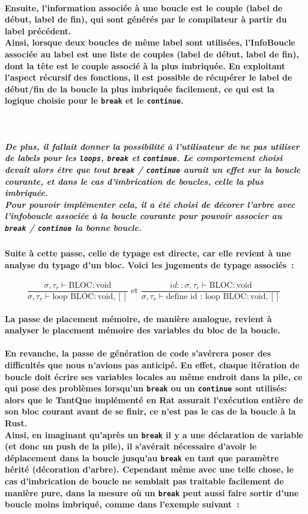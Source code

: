 \documentclass[french]{article}
\newcommand{\jugementLoop}{
        \dfrac{\sigma, \tau_r \vdash \text{BLOC} : \text{void}}
              {\sigma, \tau_r \vdash \text{loop} \text{ BLOC} : \text{void}, []}
        }
\newcommand{\jugementLoopId}{
        \dfrac{id::\sigma, \tau_r \vdash \text{BLOC} : \text{void}}
              {\sigma, \tau_r \vdash \text{define id : loop} \text{ BLOC} : \text{void}, []}
        }
\begin{document}
\paragraph*{Ensuite, l'information associée à une boucle est le couple (label de début, label de fin), qui sont générés par le compilateur à partir du label précédent. \\
Ainsi, lorsque deux boucles de même label sont utilisées, l'InfoBoucle associée au label est une liste de couples 
(label de début, label de fin), dont la tête est le couple associé à la plus imbriquée.
En exploitant l'aspect récursif des fonctions, il est possible de récupérer le label de début/fin de la boucle la plus imbriquée facilement,
ce qui est la logique choisie pour le \texttt{break} et le \texttt{continue}.}\,
\subparagraph*{De plus, il fallait donner la possibilité à l'utilisateur de ne pas utiliser de labels pour les \texttt{loops}, \texttt{break} et \texttt{continue}. Le comportement
choisi devait alors être que tout \texttt{break} / \texttt{continue} aurait un effet sur la boucle courante, et dans le cas d'imbrication de boucles, celle la 
plus imbriquée.\\
Pour pouvoir implémenter cela, il a été choisi de décorer l'arbre avec l'infoboucle associée à la boucle courante pour pouvoir associer au \texttt{break} / \texttt{continue}
la bonne boucle.}
\paragraph*{Suite à cette passe, celle de typage est directe, car elle revient à une analyse
du typage d'un bloc. Voici les jugements de typage associés~:}
 \[\jugementLoop \text{ et } \jugementLoopId\]
\paragraph*{La passe de placement mémoire, de manière analogue, revient à analyser le placement mémoire des variables du bloc de la boucle.}
\paragraph*{En revanche, la passe de génération de code s'avérera poser des difficultés que nous n'avions pas anticipé. En effet, chaque itération de boucle doit
écrire ses variables locales au même endroit dans la pile, ce qui pose des problèmes lorsqu'un \texttt{break} ou un \texttt{continue} sont utilisés: alors que le TantQue
implémenté en Rat assurait l'exécution entière de son bloc courant avant de se finir, ce n'est pas le cas de la boucle à la Rust. \\
Ainsi, en imaginant qu'après un \texttt{break} il y a une déclaration de variable (et donc un push de la pile), il s'avérait nécessaire
d'avoir le déplacement dans la boucle jusqu'au \texttt{break} en tant que paramètre hérité (décoration d'arbre). Cependant même avec une telle chose, 
le cas d'imbrication de boucle ne semblait pas traitable facilement de manière pure, dans la mesure où un \texttt{break} peut aussi faire sortir d'une boucle moins imbriqué, comme dans 
l'exemple suivant~:}
\end{document}
